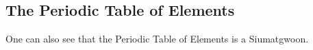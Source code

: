 \subsection{The Periodic Table of Elements}

One can also see that the Periodic Table of Elements is a Siumatgwoon. 


    
